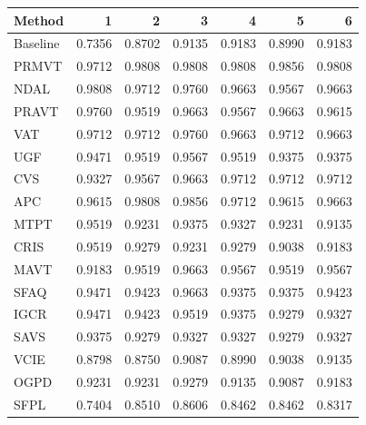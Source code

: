\begin{tabular}{lrrrrrr}
\hline
Method & 1 & 2 & 3 & 4 & 5 & 6 \\
\hline
Baseline & 0.7356 & 0.8702 & 0.9135 & 0.9183 & 0.8990 & 0.9183 \\
PRMVT & 0.9712 & 0.9808 & 0.9808 & 0.9808 & 0.9856 & 0.9808 \\
NDAL & 0.9808 & 0.9712 & 0.9760 & 0.9663 & 0.9567 & 0.9663 \\
PRAVT & 0.9760 & 0.9519 & 0.9663 & 0.9567 & 0.9663 & 0.9615 \\
VAT & 0.9712 & 0.9712 & 0.9760 & 0.9663 & 0.9712 & 0.9663 \\
UGF & 0.9471 & 0.9519 & 0.9567 & 0.9519 & 0.9375 & 0.9375 \\
CVS & 0.9327 & 0.9567 & 0.9663 & 0.9712 & 0.9712 & 0.9712 \\
APC & 0.9615 & 0.9808 & 0.9856 & 0.9712 & 0.9615 & 0.9663 \\
MTPT & 0.9519 & 0.9231 & 0.9375 & 0.9327 & 0.9231 & 0.9135 \\
CRIS & 0.9519 & 0.9279 & 0.9231 & 0.9279 & 0.9038 & 0.9183 \\
MAVT & 0.9183 & 0.9519 & 0.9663 & 0.9567 & 0.9519 & 0.9567 \\
SFAQ & 0.9471 & 0.9423 & 0.9663 & 0.9375 & 0.9375 & 0.9423 \\
IGCR & 0.9471 & 0.9423 & 0.9519 & 0.9375 & 0.9279 & 0.9327 \\
SAVS & 0.9375 & 0.9279 & 0.9327 & 0.9327 & 0.9279 & 0.9327 \\
VCIE & 0.8798 & 0.8750 & 0.9087 & 0.8990 & 0.9038 & 0.9135 \\
OGPD & 0.9231 & 0.9231 & 0.9279 & 0.9135 & 0.9087 & 0.9183 \\
SFPL & 0.7404 & 0.8510 & 0.8606 & 0.8462 & 0.8462 & 0.8317 \\
\hline
\end{tabular}
